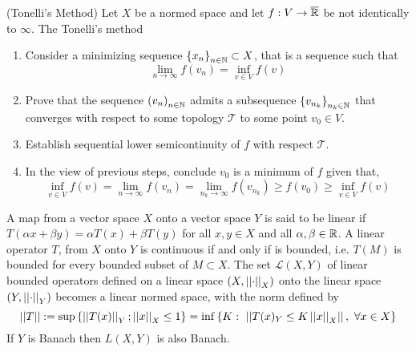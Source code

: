 \begin{theorem}(Tonelli's Method)
	Let $X$ be a normed space and let $f:V\rightarrow \overline{\mathbb{R}}$ be not identically to $\infty$. The Tonelli's method
	\begin{enumerate}
		\item Consider a minimizing sequence $\left\lbrace x_n \right\rbrace_{n\in \mathbb{N}}\subset X$, that is a sequence such that
		\begin{equation*}
		\lim_{n\rightarrow\infty}f(v_n)=\inf_{v\in V}f(v)
		\end{equation*}
		\item Prove that the sequence $\left( v_n \right)_{n\in \mathbb{N}}$ admits a subsequence $\left\lbrace v_{n_k} \right\rbrace_{n_k\in \mathbb{N}}$ that converges with respect to some topology $\mathcal T$ to some point $v_0\in V$.
		\item Establish sequential lower semicontinuity of $f$ with respect $\mathcal T$.
		\item In the view of previous steps, conclude $v_0$ is a minimum of $f$ given that,
		\begin{equation}
			\inf_{v\in V}f(v)=\lim_{n\rightarrow\infty }f(v_n)=\lim_{n_k\rightarrow \infty}f(v_{n_k})\geq f(v_0)\geq \inf_{v\in V}f(v)
		\end{equation}
	\end{enumerate}
\end{theorem}
A map from a vector space $X$ onto a vector space $Y$ is said to be linear if $T(\alpha x+\beta y)=\alpha T(x)+\beta T(y)$ for all $x,y\in X$ and all $\alpha, \beta \in \mathbb{R}$. A linear operator $T$, from $X$ onto $Y$ is continuous if and only if is bounded, i.e. $T(M)$ is bounded for every bounded subset of $M\subset X$. The set $\mathcal{L}(X,Y)$ of linear bounded operators defined on a linear space $(X, \left|\left|\cdot\right|\right|_X)$ onto the linear space $(Y, \left|\left|\cdot\right|\right|_Y)$ becomes a linear normed space, with the norm defined by
\begin{equation*}
	\norm{T}:=\sup\braces{\norm{T(x)}_Y; \norm{x}_X\leq 1}=\inf\braces{K:\ \norm{T(x)_Y\leq K\norm{x}_X},\ \forall x \in X}
\end{equation*}
If $Y$ is Banach then $L(X, Y)$ is also Banach.
\begin{definition}[Duality]
\end{definition}
